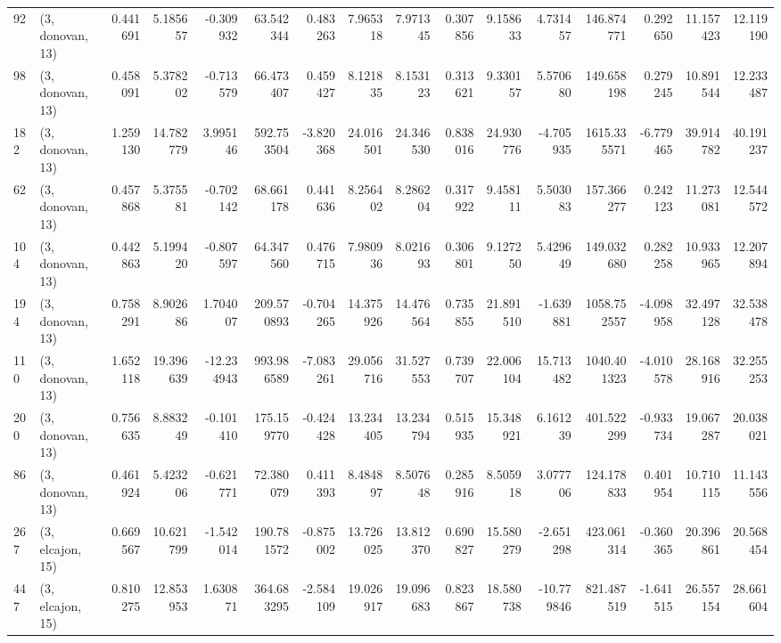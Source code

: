 \begin{tabular}{llrrrrrrrrrrrrrr}
92  &  (3, donovan, 13) &   0.441691 &   5.185657 &  -0.309932 &    63.542344 &   0.483263 &   7.965318 &   7.971345 &  0.307856 &   9.158633 &   4.731457 &   146.874771 &   0.292650 &  11.157423 &  12.119190 \\
98  &  (3, donovan, 13) &   0.458091 &   5.378202 &  -0.713579 &    66.473407 &   0.459427 &   8.121835 &   8.153123 &  0.313621 &   9.330157 &   5.570680 &   149.658198 &   0.279245 &  10.891544 &  12.233487 \\
182 &  (3, donovan, 13) &   1.259130 &  14.782779 &   3.995146 &   592.753504 &  -3.820368 &  24.016501 &  24.346530 &  0.838016 &  24.930776 &  -4.705935 &  1615.335571 &  -6.779465 &  39.914782 &  40.191237 \\
62  &  (3, donovan, 13) &   0.457868 &   5.375581 &  -0.702142 &    68.661178 &   0.441636 &   8.256402 &   8.286204 &  0.317922 &   9.458111 &   5.503083 &   157.366277 &   0.242123 &  11.273081 &  12.544572 \\
104 &  (3, donovan, 13) &   0.442863 &   5.199420 &  -0.807597 &    64.347560 &   0.476715 &   7.980936 &   8.021693 &  0.306801 &   9.127250 &   5.429649 &   149.032680 &   0.282258 &  10.933965 &  12.207894 \\
194 &  (3, donovan, 13) &   0.758291 &   8.902686 &   1.704007 &   209.570893 &  -0.704265 &  14.375926 &  14.476564 &  0.735855 &  21.891510 &  -1.639881 &  1058.752557 &  -4.098958 &  32.497128 &  32.538478 \\
110 &  (3, donovan, 13) &   1.652118 &  19.396639 & -12.234943 &   993.986589 &  -7.083261 &  29.056716 &  31.527553 &  0.739707 &  22.006104 &  15.713482 &  1040.401323 &  -4.010578 &  28.168916 &  32.255253 \\
200 &  (3, donovan, 13) &   0.756635 &   8.883249 &  -0.101410 &   175.159770 &  -0.424428 &  13.234405 &  13.234794 &  0.515935 &  15.348921 &   6.161239 &   401.522299 &  -0.933734 &  19.067287 &  20.038021 \\
86  &  (3, donovan, 13) &   0.461924 &   5.423206 &  -0.621771 &    72.380079 &   0.411393 &   8.484897 &   8.507648 &  0.285916 &   8.505918 &   3.077706 &   124.178833 &   0.401954 &  10.710115 &  11.143556 \\
267 &  (3, elcajon, 15) &   0.669567 &  10.621799 &  -1.542014 &   190.781572 &  -0.875002 &  13.726025 &  13.812370 &  0.690827 &  15.580279 &  -2.651298 &   423.061314 &  -0.360365 &  20.396861 &  20.568454 \\
447 &  (3, elcajon, 15) &   0.810275 &  12.853953 &   1.630871 &   364.683295 &  -2.584109 &  19.026917 &  19.096683 &  0.823867 &  18.580738 & -10.779846 &   821.487519 &  -1.641515 &  26.557154 &  28.661604 \\

\end{tabular}

